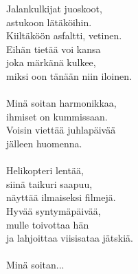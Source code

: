 
Jalankulkijat juoskoot, \\ astukoon lätäköihin. \\ Kiiltäköön asfaltti, vetinen. \\ Eihän tietää voi kansa \\ joka märkänä kulkee, \\ miksi oon tänään niin iloinen. \\ \hspace{10mm} \\ Minä soitan harmonikkaa, \\ ihmiset on kummissaan. \\ Voisin viettää juhlapäivää \\ jälleen huomenna. \\ \hspace{10mm} \\ Helikopteri lentää, \\ siinä taikuri saapuu, \\ näyttää ilmaiseksi filmejä. \\ Hyvää syntymäpäivää, \\ mulle toivottaa hän \\ ja lahjoittaa viisisataa jätskiä. \\ \hspace{10mm} \\ Minä soitan...